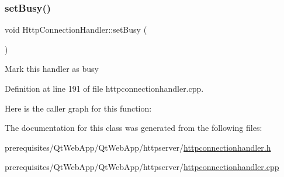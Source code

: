 \subsubsection{\texorpdfstring{set\+Busy()}{setBusy()}}
{\footnotesize\ttfamily void Http\+Connection\+Handler\+::set\+Busy (\begin{DoxyParamCaption}{ }\end{DoxyParamCaption})}

Mark this handler as busy 

Definition at line 191 of file httpconnectionhandler.\+cpp.

Here is the caller graph for this function\+:


The documentation for this class was generated from the following files\+:\begin{DoxyCompactItemize}
\item 
prerequisites/\+Qt\+Web\+App/\+Qt\+Web\+App/httpserver/\mbox{\hyperlink{httpconnectionhandler_8h}{httpconnectionhandler.\+h}}\item 
prerequisites/\+Qt\+Web\+App/\+Qt\+Web\+App/httpserver/\mbox{\hyperlink{httpconnectionhandler_8cpp}{httpconnectionhandler.\+cpp}}\end{DoxyCompactItemize}

